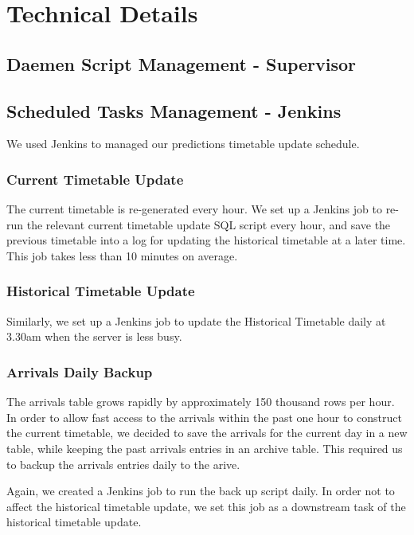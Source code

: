 \chapter{Technical Details}


\section{Daemen Script Management - Supervisor}

\section{Scheduled Tasks Management - Jenkins}
\par We used Jenkins\cite{jenkins} to managed our predictions timetable update schedule.


\subsection{Current Timetable Update}
\par The current timetable is re-generated every hour. We set up a Jenkins job to re-run the relevant current timetable update SQL script every hour, and save the previous timetable into a log for updating the historical timetable at a later time. This job takes less than 10 minutes on average.

\subsection{Historical Timetable Update}
\par Similarly, we set up a Jenkins job to update the Historical Timetable daily at 3.30am when the server is less busy.

\subsection{Arrivals Daily Backup}
\par The arrivals table grows rapidly by approximately 150 thousand rows per hour. In order to allow fast access to the arrivals within the past one hour to construct the current timetable, we decided to save the arrivals for the current day in a new table, while keeping the past arrivals entries in an archive table. This required us to backup the arrivals entries daily to the arive.

\par Again, we created a Jenkins job to run the back up script daily. In order not to affect the historical timetable update, we set this job as a downstream task of the historical timetable update.

